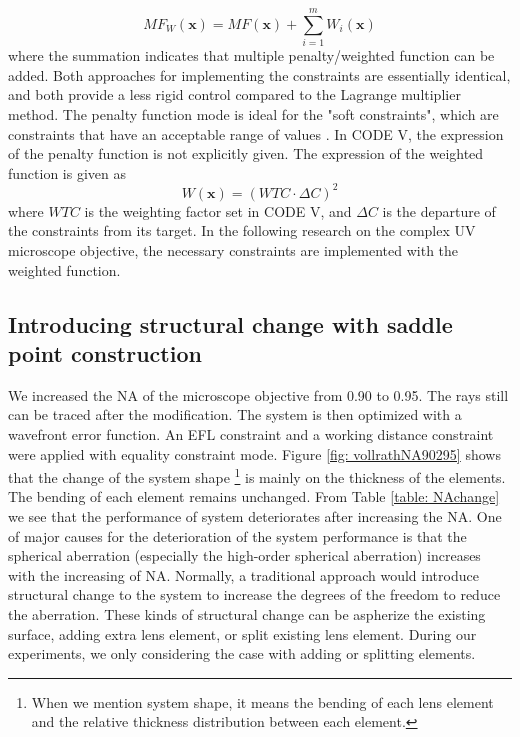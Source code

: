 \setlength{\belowdisplayshortskip}{10pt}
\begin{equation} \label{eq: MFw}
MF_W(\textbf{x})=MF(\textbf{x})+\sum_{i=1}^{m}W_i(\textbf{x})
\end{equation}
where the summation indicates that multiple penalty/weighted function can be added. Both approaches for implementing the constraints are essentially identical, and both provide a less rigid control compared to the Lagrange multiplier method. The penalty function mode is ideal for the "soft constraints", which are constraints that have an acceptable range of values \cite{codevmanual}. In CODE V, the expression of the penalty function is not explicitly given. The expression of the weighted function is given as
\setlength{\belowdisplayshortskip}{5pt}
\setlength{\abovedisplayshortskip}{5pt}
\begin{equation} \label{eq: WTC}
W(\textbf{x})=(WTC\cdot \Delta C)^2
\end{equation}
where $WTC$ is the weighting factor set in CODE V, and $\Delta C$ is the departure of the constraints from its target. In the following research on the complex UV microscope objective, the necessary constraints are implemented with the weighted function.

\subsection{Introducing structural change with saddle point construction}
We increased the NA of the microscope objective from 0.90 to 0.95. The rays still can be traced after the modification. The system is then optimized with a wavefront error function. An EFL constraint and a working distance constraint were applied with equality constraint mode. Figure \ref{fig: vollrathNA90295} shows that the change of the system shape \footnote{When we mention system shape, it means the bending of each lens element and the relative thickness distribution between each element.} is mainly on the thickness of the elements. The bending of each element remains unchanged. From Table \ref{table: NAchange} we see that the performance of system deteriorates after increasing the NA. One of major causes for the deterioration of the system performance is that the spherical aberration (especially the high-order spherical aberration) increases with the increasing of NA. Normally, a traditional approach would introduce structural change to the system to increase the degrees of the freedom to reduce the aberration. These kinds of structural change can be aspherize the existing surface, adding extra lens element, or split existing lens element. During our experiments, we only considering the case with adding or splitting elements.   

